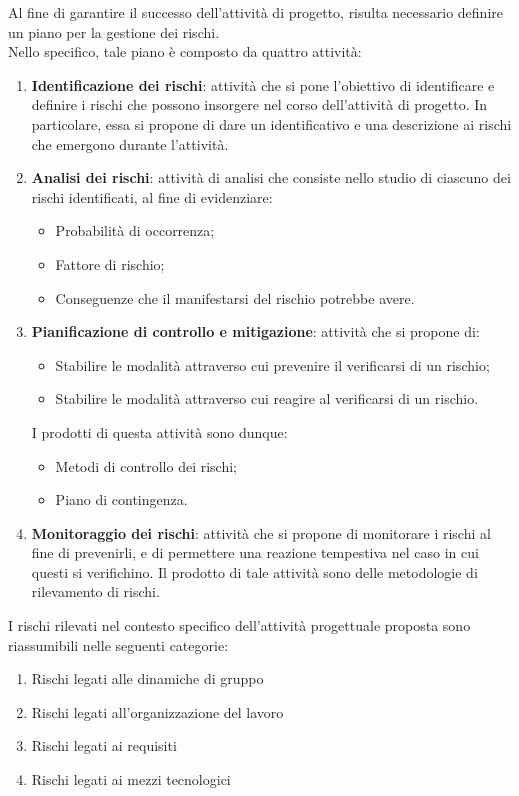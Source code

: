 	Al fine di garantire il successo dell'attività di progetto, risulta necessario definire un piano per la gestione dei rischi. \\
	Nello specifico, tale piano è composto da quattro attività:
	\begin{enumerate}
		\item \textbf{Identificazione dei rischi}: attività che si pone l'obiettivo di identificare e definire i rischi che possono insorgere nel corso dell'attività di progetto. In particolare, essa si propone di dare un identificativo e una descrizione ai rischi che emergono durante l'attività.
		\item \textbf{Analisi dei rischi}: attività di analisi che consiste nello studio di ciascuno dei rischi identificati, al fine di evidenziare:
		\begin{itemize}
			\item Probabilità di occorrenza;
			\item Fattore di rischio;
			\item Conseguenze che il manifestarsi del rischio potrebbe avere.
		\end{itemize}
		\item \textbf{Pianificazione di controllo e mitigazione}: attività che si propone di:
			\begin{itemize}
				\item Stabilire le modalità attraverso cui prevenire il verificarsi di un rischio;
				\item Stabilire le modalità attraverso cui reagire al verificarsi di un rischio.
			\end{itemize}
			I prodotti di questa attività sono dunque:
			\begin{itemize}
				\item Metodi di controllo dei rischi;
				\item Piano di contingenza.
			\end{itemize}
		\item \textbf{Monitoraggio dei rischi}: attività che si propone di monitorare i rischi al fine di prevenirli, e di permettere una reazione tempestiva nel caso in cui questi si verifichino. Il prodotto di tale attività sono delle metodologie di rilevamento di rischi.
	\end{enumerate}
	
	I rischi rilevati nel contesto specifico dell'attività progettuale proposta sono riassumibili nelle seguenti categorie:
	\begin{enumerate}
		\item Rischi legati alle dinamiche di gruppo
		\item Rischi legati all'organizzazione del lavoro
		\item Rischi legati ai requisiti
		\item Rischi legati ai mezzi tecnologici
	\end{enumerate}

